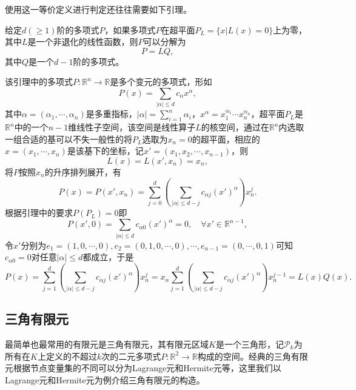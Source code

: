 \documentclass[a4paper,10pt]{ctexart}
\begin{document}
使用这一等价定义进行判定还往往需要如下引理。
\begin{lemma}\label{lem:polynomial}
    给定$ d(\geqslant 1) $阶的多项式$ P $，如果多项式$ P $在超平面$ P_L=\{x|L(x)=0\} $上为零，其中$ L $是一个非退化的线性函数，则$ P $可以分解为
    \begin{equation}
        P = LQ,
    \end{equation}
    其中$ Q $是一个$ d-1 $阶的多项式。
\end{lemma}
\noindent 该引理中的多项式$ P:\mathbb{R}^n\to \mathbb{R} $是多个变元的多项式，形如
\begin{equation}
    P(x) = \sum_{|\alpha|\leqslant d}c_\alpha x^\alpha,
\end{equation}
其中$ \alpha = (\alpha_1,\cdots ,\alpha_n) $是多重指标，$ |\alpha| = \sum_{i=1}^n \alpha_i $，$ x^\alpha = x_1^{\alpha_1}\cdots x_n^{\alpha_n} $，超平面$ P_L $是$ \mathbb{R}^n $中的一个$ n-1 $维线性子空间，该空间是线性算子$ L $的核空间，通过在$ \mathbb{R}^n $内选取一组合适的基可以不失一般性的将$ P_L $选取为$ x_n = 0 $的超平面，相应的$ x = (x_1,\cdots ,x_n) $是该基下的坐标，记$ x' = (x_1,x_2,\cdots ,x_{n-1}) $，则
\[
    L(x) = L(x',x_n) = x_n,
\]
将$ P $按照$ x_n $的升序排列展开，有
\begin{equation}
    P(x) = P(x',x_n) = \sum_{j=0}^d \left( \sum_{|\alpha|\leqslant d-j} c_{\alpha j}(x')^\alpha \right) x^j_n.
\end{equation}
根据引理中的要求$ P(P_L) = 0 $即
\[
    P(x',0) =  \sum_{|\alpha|\leqslant d} c_{\alpha 0}(x')^\alpha = 0,\quad \forall x'\in \mathbb{R}^{n-1},
\]
令$ x' $分别为$ e_1 = (1,0,\cdots ,0),e_2 = (0,1,0,\cdots ,0),\cdots ,e_{n-1} = (0,\cdots ,0,1) $可知$ c_{\alpha 0} = 0 $对任意$ |\alpha|\leqslant d $都成立，于是
\begin{equation}
    P(x) = \sum_{j=1}^d \left( \sum_{|\alpha|\leqslant d-j} c_{\alpha j}(x')^\alpha \right) x^j_n = x_n\sum_{j=1}^d \left( \sum_{|\alpha|\leqslant d-j} c_{\alpha j}(x')^\alpha \right) x_n^{j-1} = L(x)Q(x).
\end{equation}

\subsection{三角有限元}
最简单也最常用的有限元是三角有限元，其有限元区域$ K $是一个三角形，记$ \mathcal{P}_k $为所有在$ K $上定义的不超过$ k $次的二元多项式$ P:\mathbb{R}^2\to \mathbb{R} $构成的空间。经典的三角有限元根据节点变量集的不同可以分为Lagrange元和Hermite元等，这里我们以Lagrange元和Hermite元为例介绍三角有限元的构造。
\end{document}
